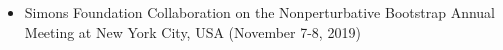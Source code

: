 
\begin{itemize}
  \item  Simons Foundation Collaboration on the Nonperturbative Bootstrap Annual Meeting at New York City, USA
  (November 7-8, 2019) \hfill  \end{itemize}
